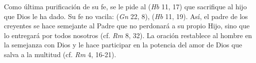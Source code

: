 \begin{ccebody}
 Como última purificación de su fe, se le pide al  (\textit{Hb} 11, 17) que sacrifique al hijo que Dios le ha dado. Su fe no vacila:  (\textit{Gn} 22, 8),  (\textit{Hb} 11, 19). Así, el padre de los creyentes se hace semejante al Padre que no perdonará a su propio Hijo, sino que lo entregará por todos nosotros (cf. \textit{Rm} 8, 32). La oración restablece al hombre en la semejanza con Dios y le hace participar en la potencia del amor de Dios que salva a la multitud (cf. \textit{Rm} 4, 16-21).
\end{ccebody}


